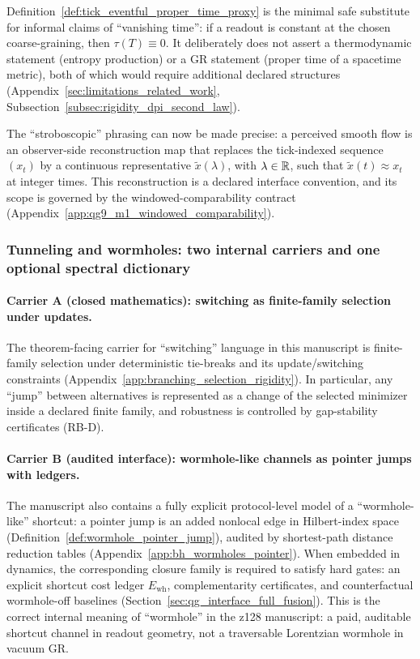 \AuditTag Definition~\ref{def:tick_eventful_proper_time_proxy} is the minimal safe substitute for informal claims of ``vanishing time'':
if a readout is constant at the chosen coarse-graining, then $\tau(T)\equiv 0$.
It deliberately does not assert a thermodynamic statement (entropy production) or a GR statement (proper time of a spacetime metric),
both of which would require additional declared structures (Appendix~\ref{sec:limitations_related_work}, Subsection~\ref{subsec:rigidity_dpi_second_law}).

\AuditTag The ``stroboscopic'' phrasing can now be made precise:
a perceived smooth flow is an observer-side reconstruction map that replaces the tick-indexed sequence $(x_t)$ by a continuous representative $\tilde x(\lambda)$,
with $\lambda\in\mathbb{R}$, such that $\tilde x(t)\approx x_t$ at integer times.
This reconstruction is a declared interface convention, and its scope is governed by the windowed-comparability contract
(Appendix~\ref{app:qg9_m1_windowed_comparability}).

\subsubsection*{Tunneling and wormholes: two internal carriers and one optional spectral dictionary}
\paragraph{Carrier A (closed mathematics): switching as finite-family selection under updates.}
\AuditTag The theorem-facing carrier for ``switching'' language in this manuscript is finite-family selection under deterministic tie-breaks
and its update/switching constraints (Appendix~\ref{app:branching_selection_rigidity}).
In particular, any ``jump'' between alternatives is represented as a change of the selected minimizer inside a declared finite family,
and robustness is controlled by gap-stability certificates (RB-D).

\paragraph{Carrier B (audited interface): wormhole-like channels as pointer jumps with ledgers.}
\AuditTag The manuscript also contains a fully explicit protocol-level model of a ``wormhole-like'' shortcut:
a pointer jump is an added nonlocal edge in Hilbert-index space (Definition~\ref{def:wormhole_pointer_jump}),
audited by shortest-path distance reduction tables (Appendix~\ref{app:bh_wormholes_pointer}).
When embedded in dynamics, the corresponding closure family is required to satisfy hard gates:
an explicit shortcut cost ledger $E_{\mathrm{wh}}$, complementarity certificates, and counterfactual wormhole-off baselines
(Section~\ref{sec:qg_interface_full_fusion}).
This is the correct internal meaning of ``wormhole'' in the z128 manuscript: a paid, auditable shortcut channel in readout geometry,
not a traversable Lorentzian wormhole in vacuum GR.

